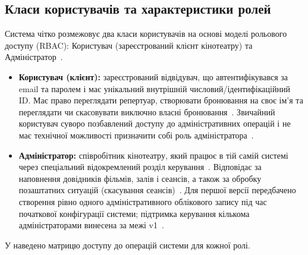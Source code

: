 \subsection{Класи користувачів та характеристики ролей}\label{sec:opis-korystuvachi}
Система чітко розмежовує два класи користувачів на основі моделі рольового доступу (RBAC): Користувач (зареєстрований клієнт кінотеатру) та Адміністратор~. 

\begin{itemize}
    \item \textbf{Користувач (клієнт):} зареєстрований відвідувач, що автентифікувався за email та паролем і має унікальний внутрішній числовий/ідентифікаційний ID. Має право переглядати репертуар, створювати бронювання на своє ім'я та переглядати чи скасовувати виключно власні бронювання~. Звичайний користувач суворо позбавлений доступу до адміністративних операцій і не має технічної можливості призначити собі роль адміністратора~.
    \item \textbf{Адміністратор:} співробітник кінотеатру, який працює в тій самій системі через спеціальний відокремлений розділ керування~. Відповідає за наповнення довідників фільмів, залів і сеансів, а також за обробку позаштатних ситуацій (скасування сеансів)~. Для першої версії передбачено створення рівно одного адміністративного облікового запису під час початкової конфігурації системи; підтримка керування кількома адміністраторами винесена за межі v1~.
\end{itemize}

У  наведено матрицю доступу до операцій системи для кожної ролі.

